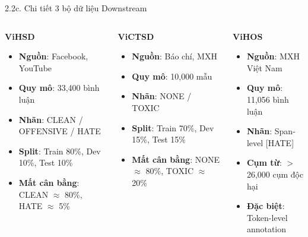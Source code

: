 \documentclass[11pt, aspectratio=169]{beamer}
\begin{document}
\begin{frame}[fragile, shrink=10]{2.2c. Chi tiết 3 bộ dữ liệu Downstream}

\begin{columns}[T]
  \begin{block}{\textbf{ViHSD}}
    \scriptsize
    \begin{itemize}
      \item \textbf{Nguồn}: Facebook, YouTube
      \item \textbf{Quy mô}: 33,400 bình luận
      \item \textbf{Nhãn}: CLEAN / OFFENSIVE / HATE
      \item \textbf{Split}: Train 80\%, Dev 10\%, Test 10\%
      \item \textbf{Mất cân bằng}: CLEAN $\approx$ 80\%, HATE $\approx$ 5\%
    \end{itemize}
  \end{block}

  \begin{block}{\textbf{ViCTSD}}
    \scriptsize
    \begin{itemize}
      \item \textbf{Nguồn}: Báo chí, MXH
      \item \textbf{Quy mô}: 10,000 mẫu
      \item \textbf{Nhãn}: NONE / TOXIC
      \item \textbf{Split}: Train 70\%, Dev 15\%, Test 15\%
      \item \textbf{Mất cân bằng}: NONE $\approx$ 80\%, TOXIC $\approx$ 20\%
    \end{itemize}
  \end{block}

  \begin{block}{\textbf{ViHOS}}
    \scriptsize
    \begin{itemize}
      \item \textbf{Nguồn}: MXH Việt Nam
      \item \textbf{Quy mô}: 11,056 bình luận
      \item \textbf{Nhãn}: Span-level [HATE]
      \item \textbf{Cụm từ}: $>$26,000 cụm độc hại
      \item \textbf{Đặc biệt}: Token-level annotation
    \end{itemize}
  \end{block}
\end{columns}


\end{frame}
\end{document}

